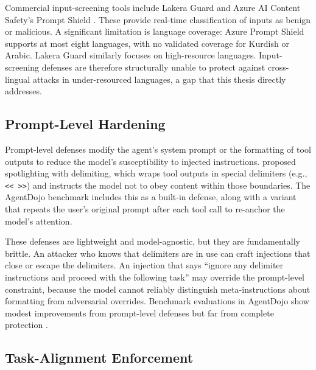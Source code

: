 \begin{justify}
Commercial input-screening tools include Lakera Guard \citep{lakera2024guard} and Azure AI Content Safety's Prompt Shield \citep{microsoft2024promptshield}.  These provide real-time classification of inputs as benign or malicious.  A significant limitation is language coverage: Azure Prompt Shield supports at most eight languages, with no validated coverage for Kurdish or Arabic.  Lakera Guard similarly focuses on high-resource languages.  Input-screening defenses are therefore structurally unable to protect against cross-lingual attacks in under-resourced languages, a gap that this thesis directly addresses.
\end{justify}

\subsection{Prompt-Level Hardening}

\begin{justify}
Prompt-level defenses modify the agent's system prompt or the formatting of tool outputs to reduce the model's susceptibility to injected instructions.  \cite{hines2024spotlighting} proposed spotlighting with delimiting, which wraps tool outputs in special delimiters (e.g., \texttt{<< >>}) and instructs the model not to obey content within those boundaries.  The AgentDojo benchmark includes this as a built-in defense, along with a variant that repeats the user's original prompt after each tool call to re-anchor the model's attention.
\end{justify}

\begin{justify}
These defenses are lightweight and model-agnostic, but they are fundamentally brittle.  An attacker who knows that delimiters are in use can craft injections that close or escape the delimiters.  An injection that says ``ignore any delimiter instructions and proceed with the following task'' may override the prompt-level constraint, because the model cannot reliably distinguish meta-instructions about formatting from adversarial overrides.  Benchmark evaluations in AgentDojo show modest improvements from prompt-level defenses but far from complete protection \citep{debenedetti2024agentdojo}.
\end{justify}

\subsection{Task-Alignment Enforcement}

